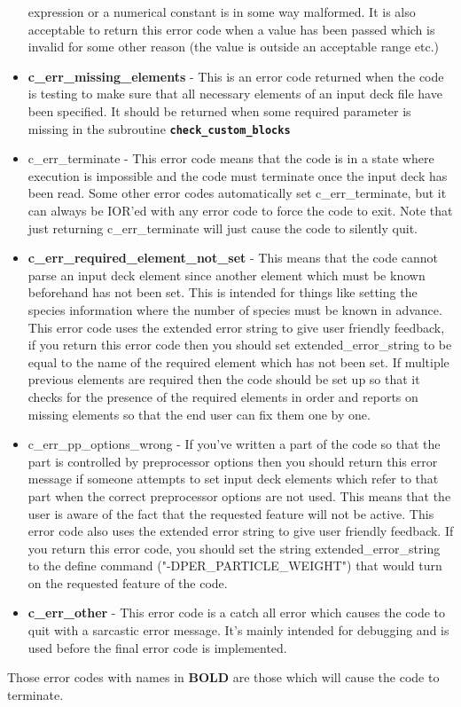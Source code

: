 \documentclass[12pt,a4paper]{article}
\newcommand{\inlinecode}[1]{{\color{warwickred} \bf\texttt{#1}}}
\begin{document}
\begin{itemize}
  expression or a numerical constant is in some way malformed. It is also
  acceptable to return this error code when a value has been passed which is
  invalid for some other reason (the value is outside an acceptable range etc.)
\item {\bf c\_err\_missing\_elements} - This is an error code returned when the
  code is testing to make sure that all necessary elements of an input deck
  file have been specified. It should be returned when some required parameter
  is missing in the subroutine \inlinecode{check\_custom\_blocks}
\item c\_err\_terminate - This error code means that the code is in a state where
  execution is impossible and the code must terminate once the input deck has
  been read. Some other error codes automatically set c\_err\_terminate, but it
  can always be IOR'ed with any error code to force the code to exit. Note that
  just returning c\_err\_terminate will just cause the code to silently quit.
\item {\bf c\_err\_required\_element\_not\_set} - This means that the code cannot
  parse an input deck element since another element which must be known
  beforehand has not been set. This is intended for things like setting the
  species information where the number of species must be known in
  advance. This error code uses the extended error string to give user friendly
  feedback, if you return this error code then you should set
  extended\_error\_string to be equal to the name of the required element which
  has not been set. If multiple previous elements are required then the code
  should be set up so that it checks for the presence of the required elements
  in order and reports on missing elements so that the end user can fix them
  one by one.
\item c\_err\_pp\_options\_wrong - If you've written a part of the code so that
  the part is controlled by preprocessor options then you should return this
  error message if someone attempts to set input deck elements which refer to
  that part when the correct preprocessor options are not used. This means that
  the user is aware of the fact that the requested feature will not be
  active. This error code also uses the extended error string to give user
  friendly feedback. If you return this error code, you should set the string
  extended\_error\_string to the define command ("-DPER\_PARTICLE\_WEIGHT")
  that would turn on the requested feature of the code.
\item {\bf c\_err\_other} - This error code is a catch all error which causes the
  code to quit with a sarcastic error message. It's mainly intended for
  debugging and is used before the final error code is implemented.
\end{itemize}

Those error codes with names in {\bf BOLD} are those which will cause the code
to terminate.
\end{document}
